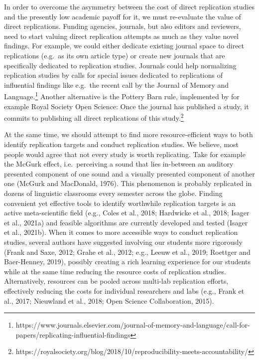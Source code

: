 \documentclass[]{elsarticle} %
\begin{document}
In order to overcome the asymmetry between the cost of direct replication studies and the presently low academic payoff for it, we must re-evaluate the value of direct replications. Funding agencies, journals, but also editors and reviewers, need to start valuing direct replication attempts as much as they value novel findings. For example, we could either dedicate existing journal space to direct replications (e.g.~as its own article type) or create new journals that are specifically dedicated to replication studies.
Journals could help normalizing replication studies by calls for special issues dedicated to replications of influential findings like e.g.~the recent call by the Journal of Memory and Language.\footnote{https://www.journals.elsevier.com/journal-of-memory-and-language/call-for-papers/replicating-influential-findings}
Another alternative is the Pottery Barn rule, implemented by for example Royal Society Open Science: Once the journal has published a study, it commits to publishing all direct replications of this study.\footnote{ https://royalsociety.org/blog/2018/10/reproducibility-meets-accountability/}

At the same time, we should attempt to find more resource-efficient ways to both identify replication targets and conduct replication studies. We believe, most people would agree that not every study is worth replicating. Take for example the McGurk effect, i.e.~perceiving a sound that lies in-between an auditory presented component of one sound and a visually presented component of another one (McGurk and MacDonald, 1976). This phenomenon is probably replicated in dozens of linguistic classrooms every semester across the globe. Finding convenient yet effective tools to identify worthwhile replication targets is an active meta-scientific field (e.g., Coles et al., 2018; Hardwicke et al., 2018; Isager et al., 2021a) and feasible algorithms are currently developed and tested (Isager et al., 2021b).
When it comes to more accessible ways to conduct replication studies, several authors have suggested involving our students more rigorously (Frank and Saxe, 2012; Grahe et al., 2012; e.g., Leeuw et al., 2019; Roettger and Baer-Henney, 2019), possibly creating a rich learning experience for our students while at the same time reducing the resource costs of replication studies. Alternatively, resources can be pooled across multi-lab replication efforts, effectively reducing the costs for individual researchers and labs (e.g., Frank et al., 2017; Nieuwland et al., 2018; Open Science Collaboration, 2015).
\end{document}
